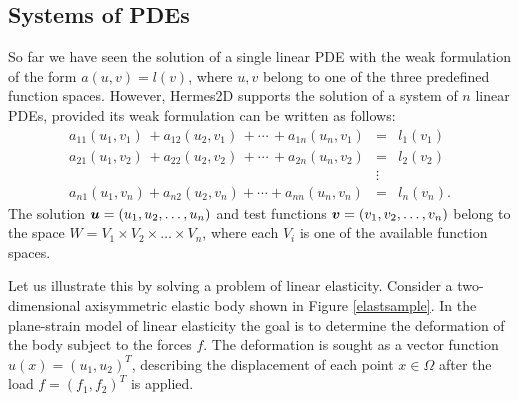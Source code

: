 
\subsection{Systems of PDEs}
\label{sec:systems}


So far we have seen the solution of a single linear PDE with the weak formulation
of the form $a(u,v) = l(v)$, where $u, v$ belong to one of the three predefined
function spaces. However, Hermes2D supports the solution of a system of $n$ linear
PDEs, provided its weak formulation can be written as follows:
\begin{eqnarray}
  a_{11}(u_1,v_1)\,+ a_{12}(u_2,v_1)\,+ \cdots\,+ a_{1n}(u_n,v_1) &=& l_1(v_1) \nonumber \\
  a_{21}(u_1,v_2)\,+ a_{22}(u_2,v_2)\,+ \cdots\,+ a_{2n}(u_n,v_2) &=& l_2(v_2) \label{weaksystem} \\
                                                      &\vdots&     \nonumber  \\
  a_{n1}(u_1,v_n) + a_{n2}(u_2,v_n) + \cdots + a_{nn}(u_n,v_n) &=& l_n(v_n). \nonumber
\end{eqnarray}
The solution $\mbox{\boldmath $u$} = (u_1, u_2, \dots, u_n)$ and test functions $\mbox{\boldmath $v$} =
(v_1, v_2, \dots, v_n)$ belong to the space $W = V_1 \times V_2 \times \dots
\times V_n$, where each $V_i$ is one of the available function spaces.

Let us illustrate this by solving a problem of linear elasticity. Consider a
two-dimensional axisymmetric elastic body shown in Figure \ref{elastsample}.
In the plane-strain model of linear elasticity the goal is to determine the
deformation of the body subject to the forces $f$. The deformation is sought
as a vector function $u(x) = (u_1, u_2)^T$, describing the displacement of each point
$x \in \Omega$ after the load $f = (f_1, f_2)^T$ is applied.

